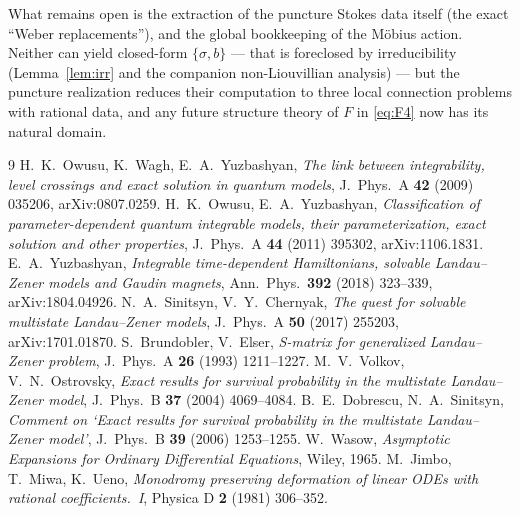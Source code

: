 \documentclass[11pt]{article}
\theoremstyle{definition}
\theoremstyle{remark}
\begin{document}
What remains open is the extraction of the puncture Stokes data itself (the exact
``Weber replacements''), and the global bookkeeping of the M\"obius action. Neither can
yield closed-form $\{\sigma,b\}$ --- that is foreclosed by irreducibility
(Lemma~\ref{lem:irr} and the companion non-Liouvillian analysis) --- but the puncture
realization reduces their computation to three local connection problems with rational
data, and any future structure theory of $F$ in \eqref{eq:F4} now has its natural
domain.

\begin{thebibliography}{9}
 H.~K.~Owusu, K.~Wagh, E.~A.~Yuzbashyan, \emph{The link between
integrability, level crossings and exact solution in quantum models}, J.\ Phys.\ A
\textbf{42} (2009) 035206, arXiv:0807.0259.
 H.~K.~Owusu, E.~A.~Yuzbashyan, \emph{Classification of
parameter-dependent quantum integrable models, their parameterization, exact solution
and other properties}, J.\ Phys.\ A \textbf{44} (2011) 395302, arXiv:1106.1831.
 E.~A.~Yuzbashyan, \emph{Integrable time-dependent Hamiltonians, solvable
Landau--Zener models and Gaudin magnets}, Ann.\ Phys.\ \textbf{392} (2018) 323--339,
arXiv:1804.04926.
 N.~A.~Sinitsyn, V.~Y.~Chernyak, \emph{The quest for solvable multistate
Landau--Zener models}, J.\ Phys.\ A \textbf{50} (2017) 255203, arXiv:1701.01870.
 S.~Brundobler, V.~Elser, \emph{S-matrix for generalized Landau--Zener
problem}, J.\ Phys.\ A \textbf{26} (1993) 1211--1227.
 M.~V.~Volkov, V.~N.~Ostrovsky, \emph{Exact results for survival
probability in the multistate Landau--Zener model}, J.\ Phys.\ B \textbf{37} (2004)
4069--4084.
 B.~E.~Dobrescu, N.~A.~Sinitsyn, \emph{Comment on `Exact results for
survival probability in the multistate Landau--Zener model'}, J.\ Phys.\ B \textbf{39}
(2006) 1253--1255.
 W.~Wasow, \emph{Asymptotic Expansions for Ordinary Differential
Equations}, Wiley, 1965.
 M.~Jimbo, T.~Miwa, K.~Ueno, \emph{Monodromy preserving deformation of
linear ODEs with rational coefficients.~I}, Physica D \textbf{2} (1981) 306--352.
\end{thebibliography}
\end{document}
